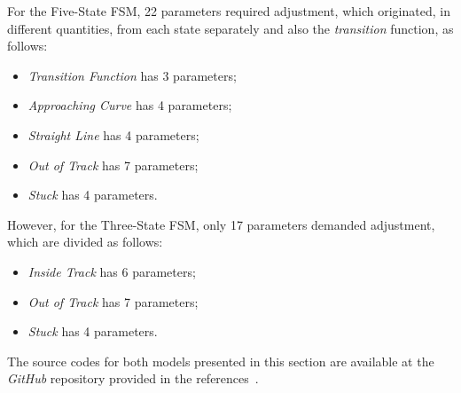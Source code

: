 	For the Five-State FSM, 22 parameters required adjustment, which originated, in different quantities, from each state separately and also the \emph{transition} function, as follows:
	
	\begin{itemize}
		
		\item \emph{Transition Function} has 3 parameters;
		
		\item \emph{Approaching Curve} has 4 parameters;
		
		\item \emph{Straight Line} has 4 parameters;
		
		\item \emph{Out of Track} has 7 parameters;
		
		\item \emph{Stuck} has 4 parameters.
		
	\end{itemize}
	
	However, for the Three-State FSM, only 17 parameters demanded adjustment, which are divided as follows:
	
	\begin{itemize}
		
		\item \emph{Inside Track} has 6 parameters;
		
		\item \emph{Out of Track} has 7 parameters;
		
		\item \emph{Stuck} has 4 parameters.
		
	\end{itemize}
	
	 The source codes for both models presented in this section are available at the \emph{GitHub} repository provided in the references~\cite{GitHub}.
